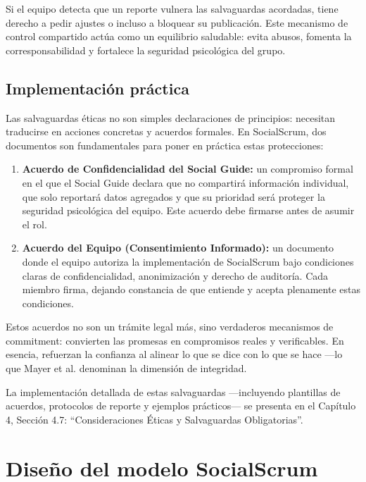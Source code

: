 Si el equipo detecta que un reporte vulnera las salvaguardas acordadas, tiene derecho a pedir ajustes o incluso a bloquear su publicación. Este mecanismo de control compartido actúa como un equilibrio saludable: evita abusos, fomenta la corresponsabilidad y fortalece la seguridad psicológica del grupo.

\subsection{Implementación práctica}

Las salvaguardas éticas no son simples declaraciones de principios: necesitan traducirse en acciones concretas y acuerdos formales. En SocialScrum, dos documentos son fundamentales para poner en práctica estas protecciones:

\begin{enumerate}
    \item \textbf{Acuerdo de Confidencialidad del Social Guide:} un compromiso formal en el que el Social Guide declara que no compartirá información individual, que solo reportará datos agregados y que su prioridad será proteger la seguridad psicológica del equipo. Este acuerdo debe firmarse antes de asumir el rol.

    \item \textbf{Acuerdo del Equipo (Consentimiento Informado):} un documento donde el equipo autoriza la implementación de SocialScrum bajo condiciones claras de confidencialidad, anonimización y derecho de auditoría. Cada miembro firma, dejando constancia de que entiende y acepta plenamente estas condiciones.

\end{enumerate}

Estos acuerdos no son un trámite legal más, sino verdaderos mecanismos de commitment: convierten las promesas en compromisos reales y verificables. En esencia, refuerzan la confianza al alinear lo que se dice con lo que se hace —lo que Mayer et al. \cite{mayer_integrative_1995} denominan la dimensión de integridad.

La implementación detallada de estas salvaguardas —incluyendo plantillas de acuerdos, protocolos de reporte y ejemplos prácticos— se presenta en el Capítulo 4, Sección 4.7: ``Consideraciones Éticas y Salvaguardas Obligatorias''.

\FloatBarrier

\section{Diseño del modelo SocialScrum}

